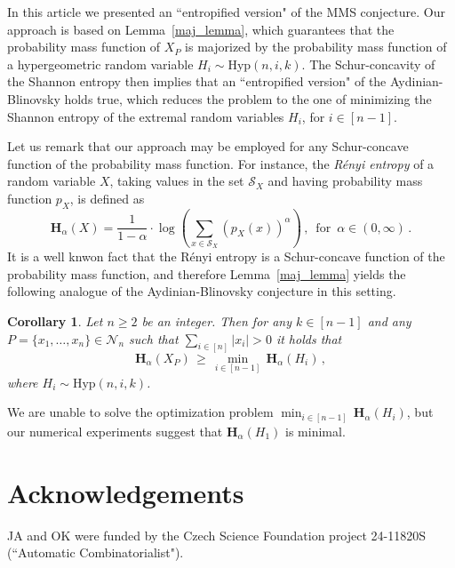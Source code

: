 \documentclass[11pt]{article}
\newtheorem{corollary}[theorem]{Corollary}
\newcommand{\bh}{\mathbf{H}}
\begin{document}
In this article we presented an ``entropified version" of the MMS conjecture. Our approach is based on Lemma~\ref{maj_lemma}, which guarantees that the probability mass function of $X_P$ is majorized by the probability mass function of a hypergeometric random variable $H_i\sim\text{Hyp}(n,i,k)$. The Schur-concavity of the Shannon entropy then  implies that an ``entropified version" of the Aydinian-Blinovsky holds true,  
which reduces the problem to the one of minimizing 
the Shannon entropy of the extremal random variables $H_i$, for $i\in [n-1]$. 

Let us remark that our approach may be employed for any Schur-concave function of the probability mass function. For instance, the \emph{R\'enyi entropy} of a random variable $X$, taking values in the set 
$\mathcal{S}_X$ and having probability mass function $p_X$, is defined as 
\[
\bh_{\alpha}(X) = \frac{1}{1-\alpha}\cdot\log\left(\sum_{x\in\mathcal{S}_X} (p_X(x))^{\alpha} \right) \, , \, \text{ for } \, \alpha \in (0,\infty) \, .
\]
It is a well knwon fact that the R\'enyi entropy is a Schur-concave function of the probability mass function, and therefore  Lemma~\ref{maj_lemma} yields the following analogue of the Aydinian-Blinovsky conjecture in this setting. 


\begin{corollary}\label{Renyi_entropy}
Let $n\ge 2$ be an integer. Then 
for any $k\in [n-1]$ and any $P=\{x_1,\ldots,x_n\}\in\mathcal{N}_n$ such that $\sum_{i\in [n]}|x_i|>0$ it holds that 
\[
\bh_{\alpha}(X_P) \,\ge\, \min_{i\in [n-1]}\,\bh_{\alpha}(H_i) \, ,
\]
where $H_i\sim\text{Hyp}(n,i,k)$. 
\end{corollary}

We are unable to solve the optimization problem $\min_{i\in [n-1]}\,\bh_{\alpha}(H_i)$, but our numerical experiments suggest that $\bh_{\alpha}(H_1)$ is minimal. 



\section*{Acknowledgements}

JA and OK were funded by the Czech Science Foundation project 24-11820S (``Automatic Combinatorialist").
\end{document}
